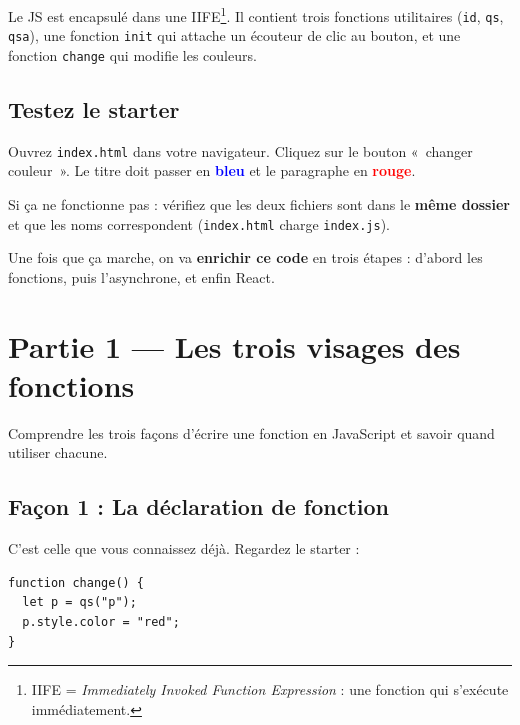\documentclass[11pt,a4paper]{article}
\begin{document}
Le JS est encapsulé dans une IIFE\footnote{IIFE = \emph{Immediately Invoked Function Expression} : une fonction qui s'exécute immédiatement.}. Il contient trois fonctions utilitaires (\texttt{id}, \texttt{qs}, \texttt{qsa}), une fonction \texttt{init} qui attache un écouteur de clic au bouton, et une fonction \texttt{change} qui modifie les couleurs.

\subsection{Testez le starter}

\begin{objectifbox}
Ouvrez \texttt{index.html} dans votre navigateur. Cliquez sur le bouton «~changer couleur~». Le titre doit passer en \textcolor{blue}{\textbf{bleu}} et le paragraphe en \textcolor{red}{\textbf{rouge}}.

Si ça ne fonctionne pas : vérifiez que les deux fichiers sont dans le \textbf{même dossier} et que les noms correspondent (\texttt{index.html} charge \texttt{index.js}).
\end{objectifbox}

Une fois que ça marche, on va \textbf{enrichir ce code} en trois étapes : d'abord les fonctions, puis l'asynchrone, et enfin React.

\section{Partie 1 --- Les trois visages des fonctions}
\label{sec:fonctions}

\begin{objectifbox}
Comprendre les trois façons d'écrire une fonction en JavaScript et savoir quand utiliser chacune.
\end{objectifbox}

\subsection{Façon 1 : La déclaration de fonction}

C'est celle que vous connaissez déjà. Regardez le starter :

\begin{lstlisting}
function change() {
  let p = qs("p");
  p.style.color = "red";
}
\end{lstlisting}
\end{document}
